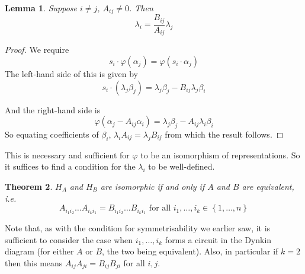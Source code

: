 \documentclass[11pt,a4paper]{report}
\newtheorem{theorem}{Theorem}[chapter]
\newtheorem{lemma}[theorem]{Lemma}
\theoremstyle{definition}
\begin{document}
\begin{lemma} \label{lem:scalardef} Suppose $i \neq j$, $A_{ij} \neq 0$. Then \begin{equation*}\lambda_i = \frac{B_{ij}}{A_{ij}} \lambda_j\end{equation*}\end{lemma}

\begin{proof} We require \begin{equation*}s_i \cdot \varphi(\alpha_j) = \varphi(s_i \cdot \alpha_j)\end{equation*} The left-hand side of this is given by \begin{equation*}s_i \cdot (\lambda_j \beta_j) = \lambda_j \beta_j - B_{ij} \lambda_j \beta_i\end{equation*}

And the right-hand side is \begin{equation*}\varphi(\alpha_j - A_{ij} \alpha_i) = \lambda_j \beta_j - A_{ij} \lambda_i \beta_i\end{equation*} So equating coefficients of $\beta_i$, $\lambda_i A_{ij} = \lambda_j B_{ij}$ from which the result follows. \end{proof}

This is necessary and sufficient for $\varphi$ to be an isomorphism of representations. So it suffices to find a condition for the $\lambda_i$ to be well-defined. 

\begin{theorem} \label{thm:isomorphcond} $H_A$ and $H_B$ are isomorphic if and only if $A$ and $B$ are equivalent, i.e. \begin{equation*}A_{i_1i_2} \ldots A_{i_k i_1} = B_{i_1 i_2} \ldots B_{i_k i_1}  \text{ for all } i_1, \ldots, i_k \in \left\{1, \ldots, n\right\}\end{equation*} \end{theorem}

Note that, as with the condition for symmetrisability we earlier saw, it is sufficient to consider the case when $i_1, \ldots, i_k$ forms a circuit in the Dynkin diagram (for either $A$ or $B$, the two being equivalent). Also, in particular if $k = 2$ then this means $A_{ij} A_{ji} = B_{ij} B_{ji}$ for all $i, j$.
\end{document}
